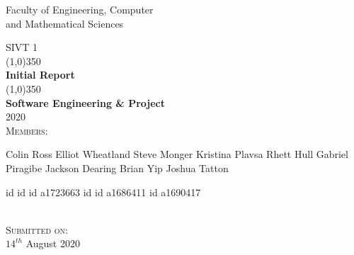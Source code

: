 \documentclass[12pt]{article}
\begin{document}
\begin{titlepage}
    \begin{center}
        \vspace*{100pt}
        \large{Faculty of Engineering, Computer\\ and Mathematical Sciences}\\
        \vspace*{15pt}
  
        {\large SIVT 1}\\
        [-5pt]
        \line(1,0){350}\\
        [15pt]
        {\huge \bfseries Initial Report }\\
        [1pt]
        \line(1,0){350}\\
        [5pt]
        {\large \bfseries Software Engineering \& Project}
        \\
        [10pt]
        {\Large 2020}\\
        \vspace*{50pt}
        \textsc{\normalsize Members:}\\
        [10pt]
    \centering
    \begin{minipage}{ .45\textwidth}
        \centering
        {\normalsize 
        \flushleft Colin Ross
        \flushleft Elliot Wheatland
        \flushleft Steve Monger 
       \flushleft Kristina Plavsa
       \flushleft Rhett Hull
        \flushleft Gabriel Piragibe
         \flushleft Jackson Dearing 
       \flushleft Brian Yip
       \flushleft Joshua Tatton\\}
    \end{minipage}%
    \begin{minipage}{0.45\textwidth}
        \centering
        {\normalsize 
        \flushright id
        \flushright id
        \flushright id
        \flushright a1723663
        \flushright id
        \flushright id
        \flushright a1686411
        \flushright id
        \flushright a1690417\\}
    
    \end{minipage}\\
    
    \vspace*{20pt}
        \textsc{\normalsize Submitted on:}\\
        [5pt]
        {$14^{th}$ August 2020}\\
    \end{center}
\end{titlepage}
\cleardoublepage
{}
\end{document}
